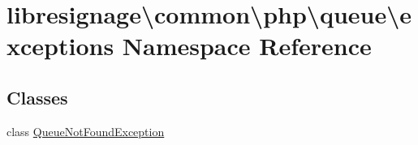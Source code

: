 \hypertarget{namespacelibresignage_1_1common_1_1php_1_1queue_1_1exceptions}{}\section{libresignage\textbackslash{}common\textbackslash{}php\textbackslash{}queue\textbackslash{}exceptions Namespace Reference}
\label{namespacelibresignage_1_1common_1_1php_1_1queue_1_1exceptions}
\subsection*{Classes}
\begin{DoxyCompactItemize}
\item 
class \hyperlink{classlibresignage_1_1common_1_1php_1_1queue_1_1exceptions_1_1QueueNotFoundException}{Queue\+Not\+Found\+Exception}
\end{DoxyCompactItemize}
